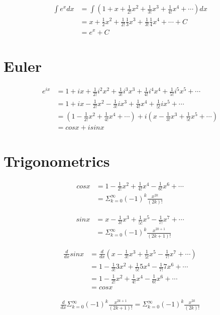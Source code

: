\documentclass[a4paper,12pt]{article}
\begin{document}
\begin{equation}
\begin{split}
\int e^x dx & = \int (1 + x + \frac{1}{2!}x^2 + \frac{1}{3!}x^3 + \frac{1}{4!}x^4 + \cdots)dx \\
 & = x + \frac{1}{2}x^2 + \frac{1}{2!}\frac{1}{3}x^3 + \frac{1}{3!}\frac{1}{4}x^4 + \cdots + C\\
 & = e^x + C
\end{split}
\end{equation}

\section{Euler}

\begin{equation}
\begin{split}
e^{ix} & = 1 + ix + \frac{1}{2!}i^2x^2 + \frac{1}{3!}i^3x^3 + \frac{1}{4!}i^4x^4 + \frac{1}{5!}i^5x^5 + \cdots \\
 & = 1 + ix - \frac{1}{2!}x^2 - \frac{1}{3!}ix^3 + \frac{1}{4!}x^4 + \frac{1}{5!}ix^5 + \cdots \\
 & = (1 - \frac{1}{2!}x^2 + \frac{1}{4!}x^4 + \cdots) + i(x - \frac{1}{3!}x^3 + \frac{1}{5!}x^5 + \cdots) \\
 & = cos x + i sin x
\end{split}
\end{equation}

\section{Trigonometrics}

\begin{equation}
\begin{split}
cos x & = 1 - \frac{1}{2!}x^2 + \frac{1}{4!}x^4 - \frac{1}{6!}x^6 + \cdots \\
 & = \Sigma_{k=0}^\infty {(-1)}^k \frac{x^{2k}}{(2k)!}
\end{split}
\end{equation}

\begin{equation}
\begin{split}
sin x & = x - \frac{1}{3!}x^3 + \frac{1}{5!}x^5 - \frac{1}{7!}x^7 + \cdots \\
 & = \Sigma_{k=0}^\infty {(-1)}^k \frac{x^{2k+1}}{(2k+1)!}
\end{split}
\end{equation}

\begin{equation}
\begin{split}
\frac{d}{dx}sin x & = \frac{d}{dx}(x - \frac{1}{3!}x^3 + \frac{1}{5!}x^5 - \frac{1}{7!}x^7 + \cdots) \\
 & = 1 - \frac{1}{3!}3x^2 + \frac{1}{5!}5x^4 - \frac{1}{7!}7x^6 + \cdots \\
 & = 1 - \frac{1}{2!}x^2 + \frac{1}{4!}x^4 - \frac{1}{6!}x^6 + \cdots \\
 & = cos x
\end{split}
\end{equation}

\begin{equation}
\begin{split}
\frac{d}{dx}\Sigma_{k=0}^\infty (-1)^k \frac{x^{2k+1}}{(2k+1)!} = \Sigma_{k=0}^\infty {(-1)}^k \frac{x^{2k}}{(2k)!}
\end{split}
\end{equation}
\end{document}
